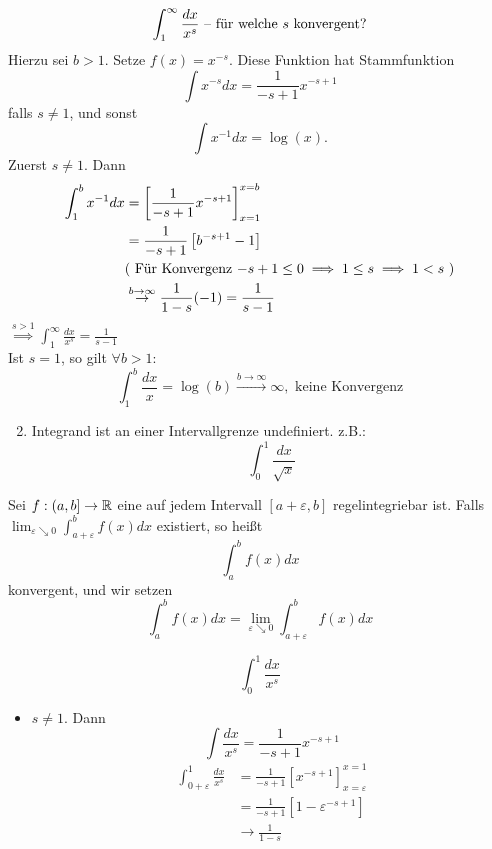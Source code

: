 \begin{subexample}
	\[
		\int_{1}^{\infty} \frac{dx}{ x^s } \text{ -- für welche $ s $ konvergent?} 
	\]
	Hierzu sei $ b > 1 $. Setze $ f(x) = x^{-s}  $. Diese Funktion hat Stammfunktion
	\[
		\int x^{-s} dx = \frac{ 1 }{ -s + 1 } x^{-s + 1} 
	\]
	falls $ s \neq 1 $, und sonst
	\[
		\int x^{-1} dx = \log (x).
	\]
	Zuerst $ s \neq 1 $. Dann
	\begin{align*}
		\int_{1}^{b}x^{-1} dx &= \left[ \frac{ 1 }{ -s + 1 } x^{-s + 1}  \right]_{x = 1} ^{x = b}  \\
		~&= \frac{ 1 }{ -s + 1 } \left[ b^{-s+1} - 1 \right] \\
		~&\text{( Für Konvergenz $ -s + 1 \leq 0 \implies 1 \leq s \implies 1 < s $ )}\\
		~&\overset{b \to \infty}{\to } \frac{ 1 }{ 1 - s } (-1) = \frac{ 1 }{ s - 1 } 
	\end{align*}
	$ \overset{s > 1}{\implies } \int_{1}^{\infty} \frac{ dx }{ x^s } = \frac{ 1 }{ s - 1 }  $\\
	Ist $ s = 1 $, so gilt $ \forall b > 1: $\\
	\[
		\int_{1}^{b} \frac{ dx }{ x } = \log (b) \overset{b \to \infty}{\to }\infty, \text{ keine Konvergenz} 
	\]
\end{subexample}

\begin{enumerate}[label=(\Alph*)]
	\setcounter{enumi}{1}
	\item Integrand ist an einer Intervallgrenze undefiniert. z.B.:
		\[
			\int_{0}^{1} \frac{dx}{ \sqrt{x}  } 
		\]
\end{enumerate}

\begin{subdefinition}
	Sei $ f: (a, b] \to \mathbb{R}  $ eine auf jedem Intervall $ [a + \varepsilon , b] $ regelintegriebar ist. Falls $ \lim_{\varepsilon \searrow 0} \int_{a+\varepsilon }^{b} f(x) dx $ existiert, so heißt
	\[
		\int_{a}^{b} f(x) dx
	\]
	konvergent, und wir setzen
	\[
		\int_{a}^{b} f(x) dx = \lim_{\varepsilon \searrow 0} \int_{a + \varepsilon }^{b}f(x) dx
	\]
	
\end{subdefinition}

\begin{subexample}
	\[
		\int_{0}^{1} \frac{ dx }{ x^{s}  } 
	\]
	\begin{itemize}
		\item $ s \neq 1 $. Dann
			\[
				\int \frac{ dx }{ x^{s}  } = \frac{ 1 }{ -s + 1 } x^{-s + 1} 
			\]
			\begin{align*}
				\int_{0 + \varepsilon }^{1} \frac{dx}{ x^{s}  } &= \frac{ 1 }{ -s + 1 } \left[ x^{-s + 1}  \right]_{x = \varepsilon } ^{x = 1}  \\
				~&= \frac{ 1 }{ -s + 1 } \left[ 1 - \varepsilon^{-s + 1}  \right] \\
				~&\to \frac{ 1 }{ 1 - s } 
			\end{align*}
			
	\end{itemize}
	
\end{subexample}

